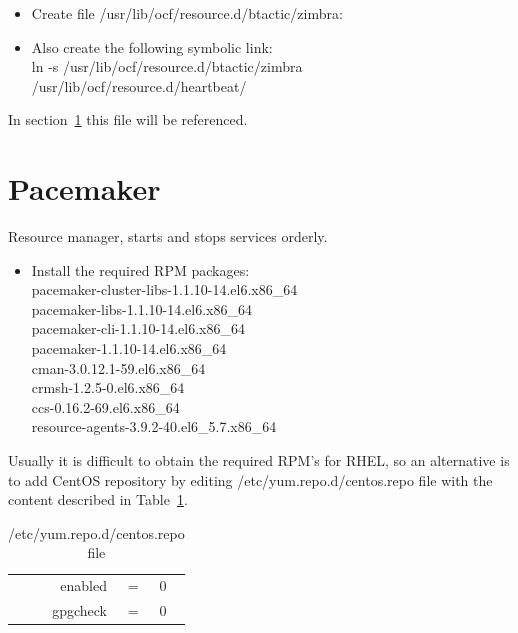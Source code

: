 \documentclass[a4paper, 12pt]{book}
\begin{document}
\begin{itemize}
	\item Create file /usr/lib/ocf/resource.d/btactic/zimbra:\\

	\item Also create the following symbolic link:\\
		ln  -s  /usr/lib/ocf/resource.d/btactic/zimbra  /usr/lib/ocf/resource.d/heartbeat/
\end{itemize}

\noindent In section~\ref{sec:pacemaker} this file will be referenced.



\section{Pacemaker}
\label{sec:pacemaker}

\noindent Resource manager, starts and stops services orderly.

\begin{itemize}
	\item Install the required RPM packages:\\
		pacemaker-cluster-libs-1.1.10-14.el6.x86\_64\\
		pacemaker-libs-1.1.10-14.el6.x86\_64\\
		pacemaker-cli-1.1.10-14.el6.x86\_64\\
		pacemaker-1.1.10-14.el6.x86\_64\\
		cman-3.0.12.1-59.el6.x86\_64\\
		crmsh-1.2.5-0.el6.x86\_64\\
		ccs-0.16.2-69.el6.x86\_64\\
		resource-agents-3.9.2-40.el6\_5.7.x86\_64
\end{itemize}

\noindent Usually it is difficult to obtain the required RPM's for RHEL, so an alternative is to add CentOS repository by editing /etc/yum.repo.d/centos.repo file with the content described in Table~\ref{table:centosrepo}.

\FloatBarrier
\begin{table}[H]
  \centering
  \begin{tabular}{ | r c l | }
    \hline
      enabled & = & 0\\
      gpgcheck & = & 0\\
    \hline
  \end{tabular}
\caption{/etc/yum.repo.d/centos.repo file}
\label{table:centosrepo}
\end{table}
\end{document}

